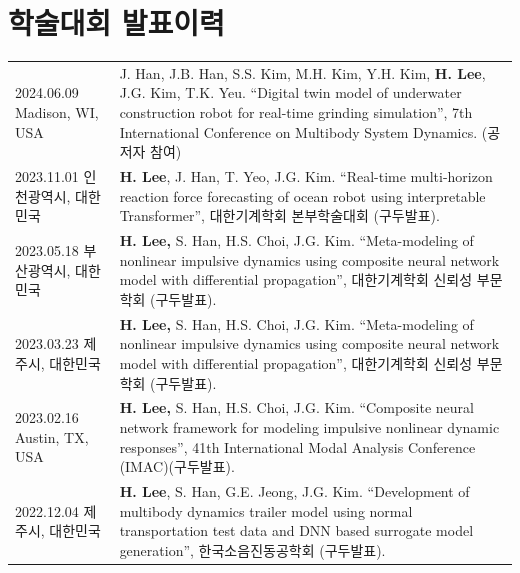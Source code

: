 \documentclass[a4paper,10pt]{extarticle}
\begin{document}
\section*{학술대회 발표이력}
\noindent
{}
\vspace*{-.5cm}
\begin{longtable}{LR}
	{2024.06.09 \linebreak Madison, WI, USA} & J. Han, J.B. Han, S.S. Kim, M.H. Kim, Y.H. Kim, \textbf{H. Lee}, J.G. Kim, T.K. Yeu. “Digital twin model of underwater construction robot for real-time grinding simulation”, 7th International Conference on Multibody System Dynamics. (공저자 참여) \\
	{2023.11.01 \linebreak 인천광역시, 대한민국}      & \textbf{H. Lee}, J. Han, T. Yeo, J.G. Kim. “Real-time multi-horizon reaction force forecasting of ocean robot using interpretable Transformer”,  대한기계학회 본부학술대회 (구두발표).                                                                            \\
	{2023.05.18 \linebreak 부산광역시, 대한민국}      & \textbf{H. Lee,} S. Han, H.S. Choi, J.G. Kim. “Meta-modeling of nonlinear impulsive dynamics using composite neural network model with differential propagation”, 대한기계학회 신뢰성 부문 학회 (구두발표).                                                        \\
	{2023.03.23 \linebreak 제주시, 대한민국}        & \textbf{H. Lee,} S. Han, H.S. Choi, J.G. Kim. “Meta-modeling of nonlinear impulsive dynamics using composite neural network model with differential propagation”, 대한기계학회 신뢰성 부문 학회 (구두발표).                                                        \\
	{2023.02.16 \linebreak  Austin, TX, USA} & \textbf{H. Lee,} S. Han, H.S. Choi, J.G. Kim. “Composite neural network framework for modeling impulsive nonlinear dynamic responses”, 41th International Modal Analysis Conference (IMAC)(구두발표).                                                 \\
	{2022.12.04 \linebreak 제주시, 대한민국}        & \textbf{H. Lee}, S. Han, G.E. Jeong, J.G. Kim. “Development of multibody dynamics trailer model using normal transportation test data and DNN based surrogate model generation”, 한국소음진동공학회 (구두발표).                                                \\
\end{longtable}
\end{document}
